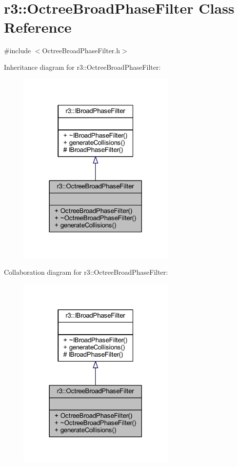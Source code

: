 \hypertarget{classr3_1_1_octree_broad_phase_filter}{}\section{r3\+:\+:Octree\+Broad\+Phase\+Filter Class Reference}
\label{classr3_1_1_octree_broad_phase_filter}


{\ttfamily \#include $<$Octree\+Broad\+Phase\+Filter.\+h$>$}



Inheritance diagram for r3\+:\+:Octree\+Broad\+Phase\+Filter\+:\nopagebreak
\begin{figure}[H]
\begin{center}
\leavevmode
\includegraphics[width=222pt]{classr3_1_1_octree_broad_phase_filter__inherit__graph}
\end{center}
\end{figure}


Collaboration diagram for r3\+:\+:Octree\+Broad\+Phase\+Filter\+:\nopagebreak
\begin{figure}[H]
\begin{center}
\leavevmode
\includegraphics[width=222pt]{classr3_1_1_octree_broad_phase_filter__coll__graph}
\end{center}
\end{figure}
